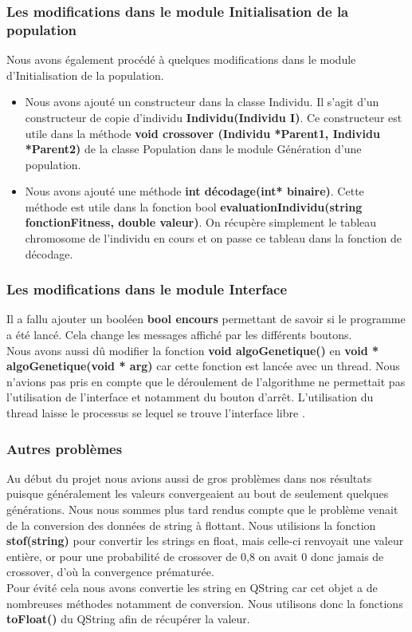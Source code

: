 \documentclass[a4paper,11pt]{article}
\begin{document}
			\subsubsection{Les modifications dans le module Initialisation de la population}
				Nous avons également procédé à quelques modifications dans le module d’Initialisation de la population.\\
				\begin{itemize}
					\item Nous avons ajouté un constructeur dans la classe Individu. Il s’agit d’un constructeur de copie d’individu  \textbf{Individu(Individu I)}. Ce constructeur est utile dans la méthode  \textbf{void crossover (Individu *Parent1, Individu *Parent2)} de la classe Population dans le module Génération d’une population.

					\item Nous avons ajouté une méthode  \textbf{int décodage(int* binaire)}. Cette méthode est  utile dans la fonction bool  \textbf{evaluationIndividu(string fonctionFitness, double valeur)}. On récupère simplement le tableau chromosome de l’individu en cours et on passe ce tableau dans la fonction de décodage.\\
				\end{itemize}

			\subsubsection{Les modifications dans le module Interface}
				Il a fallu ajouter un booléen  \textbf{bool encours} permettant de savoir si le programme a été lancé. Cela change les messages affiché par les différents boutons.\\
				Nous avons aussi dû modifier la fonction  \textbf{void algoGenetique()} en  \textbf{void * algoGenetique(void * arg)} car cette fonction est lancée avec un thread.
				Nous n’avions pas pris en compte que le déroulement de l’algorithme ne permettait pas l’utilisation de l’interface et notamment du bouton d'arrêt. L’utilisation du thread laisse le processus se lequel se trouve l’interface libre .\\

			\subsubsection{Autres problèmes}
				Au début du projet nous avions aussi de gros problèmes dans nos résultats puisque généralement les valeurs convergeaient au bout de seulement quelques générations. Nous nous sommes plus tard rendus compte que le problème venait de la conversion des données de string à flottant. Nous utilisions la fonction  \textbf{stof(string)} pour convertir les strings en float, mais celle-ci renvoyait une valeur entière, or pour une probabilité de crossover de 0,8 on avait 0 donc jamais de crossover, d’où la convergence prématurée.\\
				Pour évité cela nous avons convertie les string en QString car cet objet a de nombreuses méthodes notamment de conversion. Nous utilisons donc la fonctions  \textbf{toFloat()} du QString afin de récupérer la valeur.\\
\end{document}
